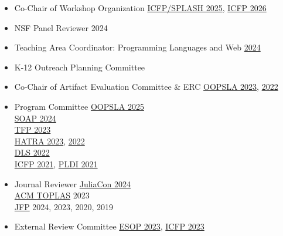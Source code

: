 \documentclass[11pt]{article}
\begin{document}
\begin{itemize}
  \item {Co-Chair of Workshop Organization} \hfill \href{https://conf.researchr.org/committee/icfp-splash-2025/icfp-splash-2025-organizing-committee}{ICFP/SPLASH 2025}, \href{}{ICFP 2026}
  \item {NSF Panel Reviewer} \hfill {2024}
  \item {Teaching Area Coordinator: Programming Languages and Web} \hfill \href{https://users.cs.utah.edu/~regehr/teaching_areas/}{2024}
  \item {K-12 Outreach Planning Committee} \hfill {}
  \item {Co-Chair of Artifact Evaluation Committee \& ERC} \hfill \href{https://2023.splashcon.org}{OOPSLA 2023}, \href{https://2022.splashcon.org}{2022}
  \item {Program Committee} \hfill \href{https://2025.splashcon.org/committee/splash-2025-OOPSLA-oopsla-review-committee}{OOPSLA 2025} \\
   \hbox{} \hfill \href{https://pldi24.sigplan.org/home/SOAP-2024}{SOAP 2024} \\
   \hbox{} \hfill \href{https://trendsfp.github.io/}{TFP 2023} \\
   \hbox{}\hfill \href{https://2023.splashcon.org/home/hatra-2023}{HATRA 2023}, \href{https://2022.splashcon.org/home/hatra-2022}{2022} \\
   \hbox{}\hfill \href{https://2022.splashcon.org/track/dls-2022-papers}{DLS 2022} \\
   \hbox{}\hfill \href{https://icfp21.sigplan.org/committee/icfp-2021-papers-program-committee}{ICFP 2021}, \href{https://pldi21.sigplan.org/committee/pldi-2021-papers-program-committee}{PLDI 2021}
  \item {Journal Reviewer} \hfill
    \href{https://juliacon.org/2024/}{JuliaCon 2024} \\
    \hbox{}\hfill \href{https://dl.acm.org/journal/toplas}{ACM TOPLAS} 2023 \\
    \hbox{}\hfill \href{https://www.cambridge.org/core/journals/journal-of-functional-programming}{JFP} 2024, 2023, 2020, 2019
  \item {External Review Committee} \hfill \href{https://etaps.org/2023/esop}{ESOP 2023},
                                           \href{https://icfp23.sigplan.org/}{ICFP 2023}

\end{itemize}
\end{document}
